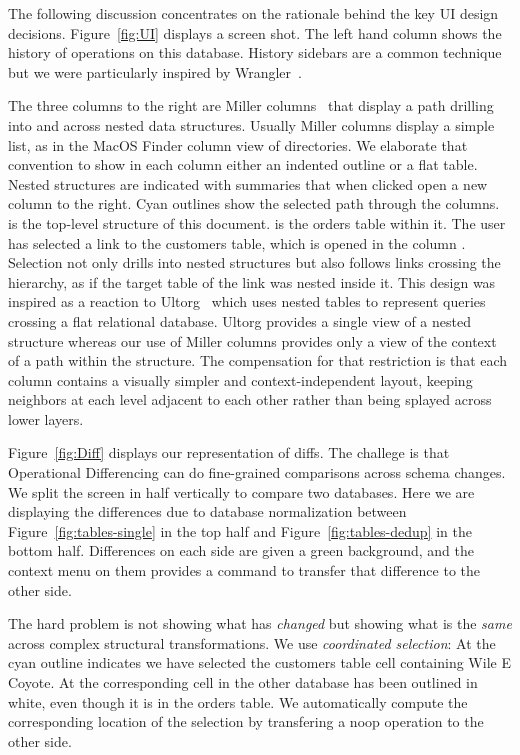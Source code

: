 \documentclass[english,submission]{programming}
\theoremstyle{definition}
\begin{document}

The following discussion concentrates on the rationale behind the key UI design decisions.
Figure~\ref{fig:UI} displays a screen shot.  The left hand column shows the history of operations on this database. History sidebars are a common technique but we were particularly inspired by Wrangler~\cite{kandel11}.

The three columns to the right are Miller columns~\cite{miller-columns} that display a path drilling into and across nested data structures. Usually Miller columns display a simple list, as in the MacOS Finder column view of directories. We elaborate that convention to show in each column either an indented outline or a flat table. Nested structures are indicated with summaries that when clicked open a new column to the right. Cyan outlines show the selected path through the columns.  is the top-level structure of this document.  is the \textsf{orders} table within it. The user has selected a link to the \textsf{customers} table, which is opened in the column . Selection not only drills into nested structures but also follows links crossing the hierarchy, as if the target table of the link was nested inside it. This design was inspired as a reaction to Ultorg~\cite{bakke:phdthesis, ultorg} which uses nested tables to represent queries crossing a flat relational database. Ultorg provides a single view of a nested structure whereas our use of Miller columns provides only a view of the context of a path within the structure. The compensation for that restriction is that each column contains a visually simpler and context-independent layout, keeping neighbors at each level adjacent to each other rather than being splayed across lower layers.

Figure~\ref{fig:Diff} displays our representation of diffs. The challege is that Operational Differencing can do fine-grained comparisons across schema changes. We split the screen in half vertically to compare two databases. Here we are displaying the differences due to database normalization between Figure~\ref{fig:tables-single} in the top half and Figure~\ref{fig:tables-dedup} in the bottom half. Differences on each side are given a green background, and the context menu on them provides a command to transfer that difference to the other side.

The hard problem is not showing what has \textit{changed} but showing what is the \textit{same} across complex structural transformations.
We use \textit{coordinated selection}:  At  the cyan outline indicates we have selected the \textsf{customers} table cell containing \textsf{Wile E Coyote}. At  the corresponding cell in the other database has been outlined in white, even though it is in the \textsf{orders} table. We automatically compute the corresponding location of the selection by transfering a \textsf{noop} operation to the other side.
\end{document}
